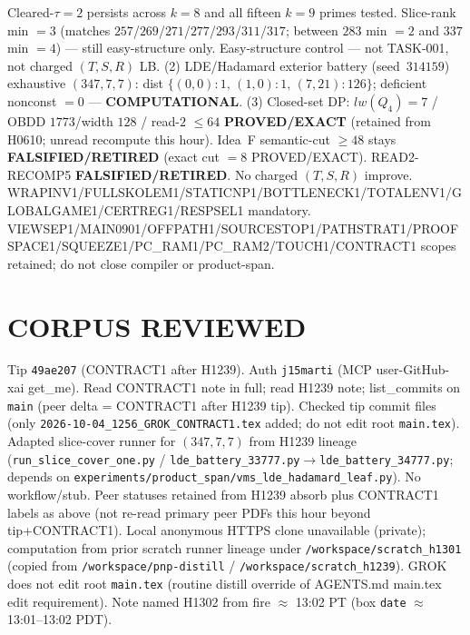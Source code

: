 \documentclass[11pt]{article}
\begin{document}
Cleared-$\tau{=}2$ persists across $k{=}8$ and all fifteen $k{=}9$ primes tested.
Slice-rank min $=3$ (matches $257$/$269$/$271$/$277$/$293$/$311$/$317$; between $283$ min $=2$ and $337$ min $=4$) --- still easy-structure only.
Easy-structure control --- not TASK-001, not charged $(T,S,R)$ LB.
(2) LDE/Hadamard exterior battery (seed~$314159$) exhaustive $(347,7,7)$:
dist $\{(0,0){:}1,\,(1,0){:}1,\,(7,21){:}126\}$; deficient nonconst $=0$ --- \textbf{COMPUTATIONAL}.
(3) Closed-set DP: $lw(Q_4)=7$ / OBDD $1773$/width $128$ / read-$2$ $\le64$
\textbf{PROVED/EXACT} (retained from H0610; unread recompute this hour).
Idea~F semantic-cut $\ge48$ stays \textbf{FALSIFIED/RETIRED} (exact cut $=8$ PROVED/EXACT).
READ2-RECOMP5 \textbf{FALSIFIED/RETIRED}. No charged $(T,S,R)$ improve.
WRAPINV1/FULLSKOLEM1/STATICNP1/BOTTLENECK1/TOTALENV1/GLOBALGAME1/CERTREG1/RESPSEL1 mandatory.
VIEWSEP1/MAIN0901/OFFPATH1/SOURCESTOP1/PATHSTRAT1/PROOFSPACE1/SQUEEZE1/PC\_RAM1/PC\_RAM2/TOUCH1/CONTRACT1 scopes retained; do not close compiler or product-span.

\section*{CORPUS REVIEWED}
Tip \texttt{49ae207} (CONTRACT1 after H1239). Auth \texttt{j15marti} (MCP user-GitHub-xai get\_me).
Read CONTRACT1 note in full; read H1239 note; list\_commits on \texttt{main} (peer delta = CONTRACT1 after H1239 tip).
Checked tip commit files (only \texttt{2026-10-04\_1256\_GROK\_CONTRACT1.tex} added; do not edit root \texttt{main.tex}).
Adapted slice-cover runner for $(347,7,7)$ from H1239 lineage
(\texttt{run\_slice\_cover\_one.py} / \texttt{lde\_battery\_33777.py}$\to$\texttt{lde\_battery\_34777.py};
depends on \texttt{experiments/product\_span/vms\_lde\_hadamard\_leaf.py}).
No workflow/stub. Peer statuses retained from H1239 absorb plus CONTRACT1 labels as above
(not re-read primary peer PDFs this hour beyond tip+CONTRACT1).
Local anonymous HTTPS clone unavailable (private);
computation from prior scratch runner lineage under \texttt{/workspace/scratch\_h1301}
(copied from \texttt{/workspace/pnp-distill} / \texttt{/workspace/scratch\_h1239}).
GROK does not edit root \texttt{main.tex} (routine distill override of AGENTS.md main.tex edit requirement).
Note named H1302 from fire $\approx$ 13:02 PT (box \texttt{date} $\approx$ 13:01--13:02 PDT).
\end{document}
